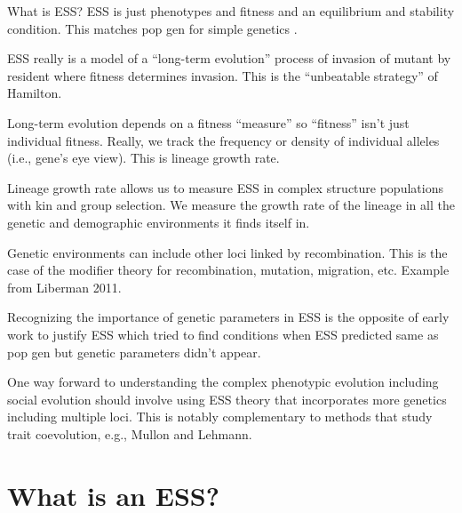 \documentclass[11pt]{article}
\begin{document}

What is ESS? ESS is just phenotypes and fitness and an equilibrium and stability condition. This matches pop gen for simple genetics \cite{Eshel:1982}.


ESS really is a model of a ``long-term evolution'' process of invasion of mutant by resident where fitness determines invasion. This is the ``unbeatable strategy'' of Hamilton.

Long-term evolution depends on a fitness ``measure'' so ``fitness'' isn't just individual fitness. Really, we track the frequency or density of individual alleles (i.e., gene's eye view). This is lineage growth rate.

Lineage growth rate allows us to measure ESS in complex structure populations with kin and group selection. We measure the growth rate of the lineage in all the genetic and demographic environments it finds itself in.

Genetic environments can include other loci linked by recombination. This is the case of the modifier theory for recombination, mutation, migration, etc. Example from Liberman 2011.

Recognizing the importance of genetic parameters in ESS is the opposite of early work to justify ESS which tried to find conditions when ESS predicted same as pop gen but genetic parameters didn't appear.

One way forward to understanding the complex phenotypic evolution including social evolution should involve using ESS theory that incorporates more genetics including multiple loci. This is notably complementary to methods that study trait coevolution, e.g., Mullon and Lehmann.


\section{What is an ESS?}
\end{document}
